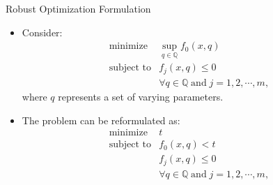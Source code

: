 \documentclass[10pt,ignorenonframetext,serif,onlymath]{beamer}
\begin{document}
\begin{frame}{Robust Optimization Formulation}
\protect\hypertarget{sec:robust-optimization-formulation}{}

\begin{itemize}
\item
  Consider: \[\begin{array}{ll}
      \text{minimize}   & \sup_{q \in {\mathbb{Q}}} f_0(x,q) \\
      \text{subject to} & f_j(x,q) \leq 0 \qquad \\
      & \forall q \in {\mathbb{Q}} \; \text{and} \; j = 1,2,\cdots,m,
    \end{array}\] where \(q\) represents a set of varying parameters.
\item
  The problem can be reformulated as: \[\begin{array}{ll}
      \text{minimize}   & t \\
      \text{subject to} & f_0(x,q) < t  \\
      & f_j(x,q) \leq 0 \\
      & \forall q \in {\mathbb{Q}} \; \text{and} \; j = 1,2,\cdots,m,
    \end{array}\]
\end{itemize}

\end{frame}
\end{document}
